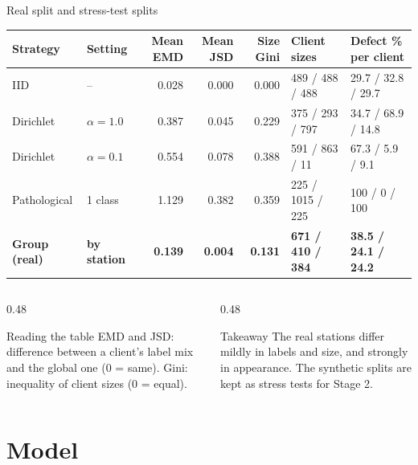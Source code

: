 \documentclass[aspectratio=169,10pt]{beamer}
\begin{document}
\begin{frame}{Real split and stress-test splits}
  \centering
  \footnotesize
  \setlength{\tabcolsep}{4pt}
  \begin{tabular}{llrrrll}
    \toprule
    Strategy & Setting & Mean EMD & Mean JSD & Size Gini & Client sizes & Defect \% per client \\
    \midrule
    IID          & --           & 0.028 & 0.000 & 0.000 & 489 / 488 / 488  & 29.7 / 32.8 / 29.7 \\
    Dirichlet    & $\alpha=1.0$ & 0.387 & 0.045 & 0.229 & 375 / 293 / 797  & 34.7 / 68.9 / 14.8 \\
    Dirichlet    & $\alpha=0.1$ & 0.554 & 0.078 & 0.388 & 591 / 863 / 11   & 67.3 / 5.9 / 9.1 \\
    Pathological & 1 class      & 1.129 & 0.382 & 0.359 & 225 / 1015 / 225 & 100 / 0 / 100 \\
    \textbf{Group (real)} & \textbf{by station} & \textbf{0.139} & \textbf{0.004} & \textbf{0.131}
                 & \textbf{671 / 410 / 384} & \textbf{38.5 / 24.1 / 24.2} \\
    \bottomrule
  \end{tabular}
  \par\vspace{0.3cm}
  \begin{columns}[T]
    \begin{column}{0.48\textwidth}
      \begin{block}{Reading the table}
        EMD and JSD: difference between a client's label mix and the global one
        (0 = same). Gini: inequality of client sizes (0 = equal).
      \end{block}
    \end{column}
    \begin{column}{0.48\textwidth}
      \begin{alertblock}{Takeaway}
        The real stations differ mildly in labels and size, and strongly in
        appearance. The synthetic splits are kept as stress tests for Stage 2.
      \end{alertblock}
    \end{column}
  \end{columns}
\end{frame}

\section{Model}
\end{document}
